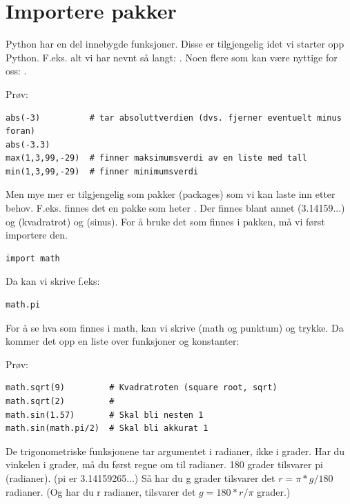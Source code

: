 \section{Importere pakker}

Python har en del innebygde funksjoner. Disse er tilgjengelig idet vi starter opp Python. F.eks. alt vi har nevnt så langt: . Noen flere som kan være nyttige for oss: .

Prøv:
\begin{lstlisting}
abs(-3)          # tar absoluttverdien (dvs. fjerner eventuelt minus foran)
abs(-3.3)
max(1,3,99,-29)  # finner maksimumsverdi av en liste med tall
min(1,3,99,-29)  # finner minimumsverdi 
\end{lstlisting}

Men mye mer er tilgjengelig som pakker (packages) som vi kan laste inn etter behov. F.eks. finnes det en pakke som heter . Der finnes blant annet  (3.14159...) og  (kvadratrot) og  (sinus). For å bruke det som finnes i pakken, må vi først importere den.

\begin{lstlisting}
import math
\end{lstlisting}

Da kan vi skrive f.eks:
\begin{lstlisting}
math.pi
\end{lstlisting}

For å se hva som finnes i math, kan vi skrive  (math og punktum) og trykke. Da kommer det opp en liste over funksjoner og konstanter:

Prøv:
\begin{lstlisting}
math.sqrt(9)         # Kvadratroten (square root, sqrt)
math.sqrt(2)         # 
math.sin(1.57)       # Skal bli nesten 1
math.sin(math.pi/2)  # Skal bli akkurat 1
\end{lstlisting}

\begin{usncomment}
De trigonometriske funksjonene tar argumentet i radianer, ikke i grader. Har du vinkelen i grader, må du først regne om til radianer. 180 grader tilsvarer pi (radianer). (pi er 3.14159265...) Så har du g grader tilsvarer det $r = \pi * g / 180$  radianer. (Og har du r radianer, tilsvarer det $g = 180 * r / \pi$  grader.)
\end{usncomment}


